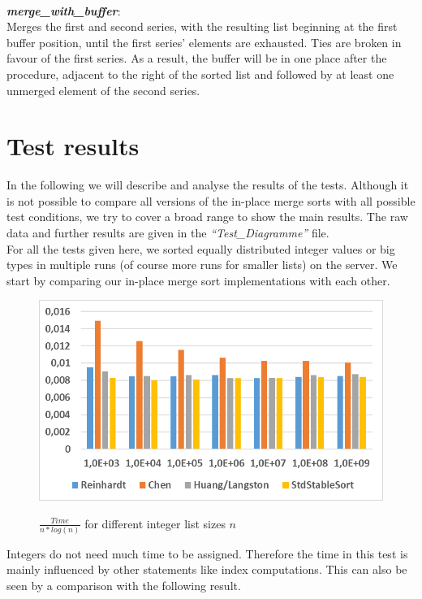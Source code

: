 \documentclass[11pt,pdftex,a4paper, twocolumn]{article}
\begin{document}
$ $ \\
\textbf{\textit{merge\_with\_buffer}}: \\
Merges the first and second series, with the resulting list beginning at the first buffer position, until the first series’ elements are exhausted. Ties are broken in favour of the first series. As a result, the buffer will be in one place after the procedure, adjacent to the right of the sorted list and followed by at least one unmerged element of the second series.

\section*{Test results}
In the following we will describe and analyse the results of the tests. Although it is not possible to compare all versions of the in-place merge sorts with all possible test conditions, we try to cover a broad range to show the main results. The raw data and further results are given in the \textit{“Test\_Diagramme”} file. \\
For all the tests given here, we sorted equally distributed integer values or big types in multiple runs (of course more runs for smaller lists) on the server. We start by comparing our in-place merge sort implementations with each other. \\
\begin{figure}[H]
\includegraphics[width=\linewidth]{Diagramm-Bilder/ints-time.JPG} \\
\caption{ $ \frac{Time}{n*log(n)} $ for different integer list sizes $ n $ } \label{fig:ints-time}
\end{figure}
Integers do not need much time to be assigned. Therefore the time in this test is mainly influenced by other statements like index computations. This can also be seen by a comparison with the following result. \\
\end{document}
